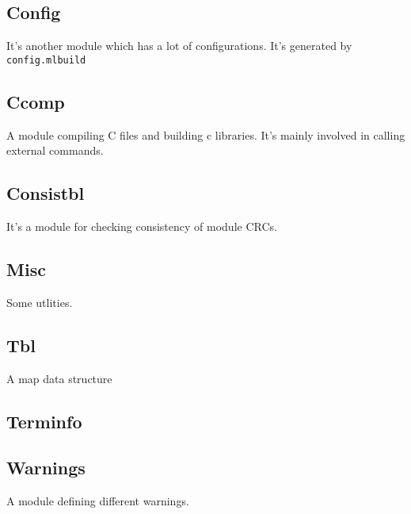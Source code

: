 \subsection{Config}
It's another module which has a lot of configurations. It's generated
by \verb|config.mlbuild|

\subsection{Ccomp}

A module compiling C files and building c libraries. It's mainly
involved in calling external commands.


\subsection{Consistbl}

It's a module for checking consistency of module CRCs.

\subsection{Misc}

Some utlities.

\subsection{Tbl}
A map data structure


\subsection{Terminfo}

\subsection{Warnings}

A module defining different warnings.
